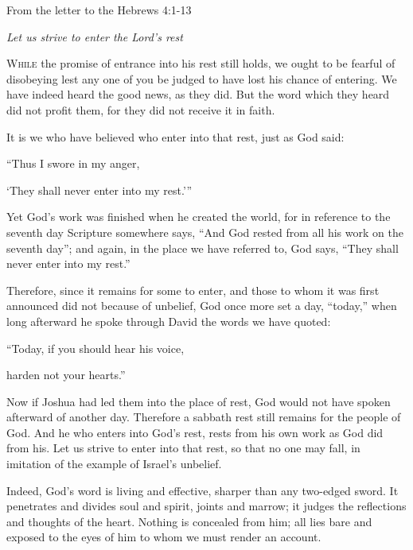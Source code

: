 \noindent From the letter to the Hebrews \hfill 4:1-13

\begin{center}\textit{Let us strive to enter the Lord’s rest}\end{center}

\lettrine[lines=3,loversize=0.15]{W}{hile} the promise of entrance into his rest still holds, we ought to be fearful of disobeying lest any one of you be judged to have lost his chance of entering. We have indeed heard the good news, as they did. But the word which they heard did not profit them, for they did not receive it in faith.

It is we who have believed who enter into that rest, just as God said:

\vspace{5pt}
 “Thus I swore in my anger,\par
    ‘They shall never enter into my rest.’”
\vspace{5pt}

Yet God’s work was finished when he created the world, for in reference to the seventh day Scripture somewhere says, “And God rested from all his work on the seventh day”; and again, in the place we have referred to, God says, “They shall never enter into my rest.”

Therefore, since it remains for some to enter, and those to whom it was first announced did not because of unbelief, God once more set a day, “today,” when long afterward he spoke through David the words we have quoted:

\vspace{5pt}
   “Today, if you should hear his voice,\par
      harden not your hearts.”
\vspace{5pt}

Now if Joshua had led them into the place of rest, God would not have spoken afterward of another day. Therefore a sabbath rest still remains for the people of God. And he who enters into God’s rest, rests from his own work as God did from his. Let us strive to enter into that rest, so that no one may fall, in imitation of the example of Israel’s unbelief.

Indeed, God’s word is living and effective, sharper than any two-edged sword. It penetrates and divides soul and spirit, joints and marrow; it judges the reflections and thoughts of the heart. Nothing is concealed from him; all lies bare and exposed to the eyes of him to whom we must render an account.

